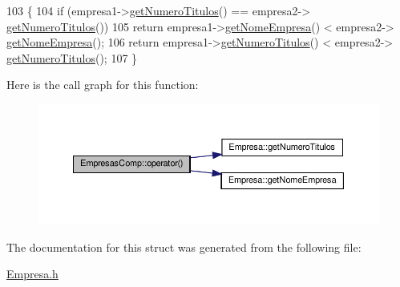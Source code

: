\begin{DoxyCode}
103     \{
104         \textcolor{keywordflow}{if} (empresa1->\hyperlink{classEmpresa_a49b2b94a54bbc341822f64fc194f98fd}{getNumeroTitulos}() == empresa2->
      \hyperlink{classEmpresa_a49b2b94a54bbc341822f64fc194f98fd}{getNumeroTitulos}())
105             \textcolor{keywordflow}{return} empresa1->\hyperlink{classEmpresa_a99bc2de98a0c0348abb74c93e6e7159e}{getNomeEmpresa}() < empresa2->
      \hyperlink{classEmpresa_a99bc2de98a0c0348abb74c93e6e7159e}{getNomeEmpresa}();
106         \textcolor{keywordflow}{return} empresa1->\hyperlink{classEmpresa_a49b2b94a54bbc341822f64fc194f98fd}{getNumeroTitulos}() < empresa2->
      \hyperlink{classEmpresa_a49b2b94a54bbc341822f64fc194f98fd}{getNumeroTitulos}();
107     \}
\end{DoxyCode}
Here is the call graph for this function\+:
\nopagebreak
\begin{figure}[H]
\begin{center}
\leavevmode
\includegraphics[width=350pt]{structEmpresasComp_a65f437399b6aa939ee84611a69ee0ad0_cgraph}
\end{center}
\end{figure}


The documentation for this struct was generated from the following file\+:\begin{DoxyCompactItemize}
\item 
\hyperlink{Empresa_8h}{Empresa.\+h}\end{DoxyCompactItemize}
